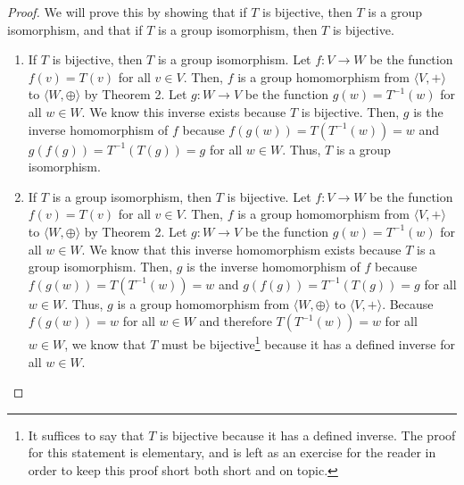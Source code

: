 \documentclass{article}
\newcommand{\done}{\renewcommand\qedsymbol{$\blacksquare$}}
\begin{document}
\begin{proof}
  We will prove this by showing that if $T$ is bijective, then $T$ is a group isomorphism, and that if $T$ is a group isomorphism, then $T$ is bijective.
  \begin{enumerate}
    \item If $T$ is bijective, then $T$ is a group isomorphism. 
    Let $f:V\rightarrow W$ be the function $f(v) = T(v)$ for all $v\in V$. 
    Then, $f$ is a group homomorphism from $\langle V, + \rangle$ to 
    $\langle W, \oplus \rangle$ by Theorem 2. Let $g:W\rightarrow V$ be the 
    function $g(w) = T^{-1}(w)$ for all $w\in W$. We know this 
    inverse exists because $T$ is bijective. Then, $g$ is the inverse 
    homomorphism of $f$ because $f(g(w)) = T(T^{-1}(w)) = w$ and 
    $g(f(g)) = T^{-1}(T(g)) = g$ for all $w\in W$. Thus, $T$ is a group isomorphism.

    \item If $T$ is a group isomorphism, then $T$ is bijective. 
    Let $f:V\rightarrow W$ be the function $f(v) = T(v)$ for all $v\in V$. 
    Then, $f$ is a group homomorphism from $\langle V, + \rangle$ to 
    $\langle W, \oplus \rangle$ by Theorem 2. Let $g:W\rightarrow V$ be the 
    function $g(w) = T^{-1}(w)$ for all $w\in W$. We know 
    that this inverse homomorphism exists because $T$ is a group 
    isomorphism. Then, $g$ is the inverse 
    homomorphism of $f$ because $f(g(w)) = T(T^{-1}(w)) = w$ and 
    $g(f(g)) = T^{-1}(T(g)) = g$ for all $w\in W$. Thus, $g$ is a group 
    homomorphism from $\langle W, \oplus \rangle$ to $\langle V, + \rangle$. 
    Because $f(g(w)) = w$ for all $w\in W$ and therefore $T(T^{-1}(w)) = w$ for all $w\in W$,
    we know that $T$ must be bijective\footnote[4]{
      It suffices to say that $T$ is bijective because it has a defined inverse. The 
      proof for this statement is elementary, and is left as an exercise for the reader 
      in order to keep this proof short both short and on topic.
    } because it has a defined inverse for all $w\in W$.
  \end{enumerate}
\done 
\end{proof}
\end{document}
